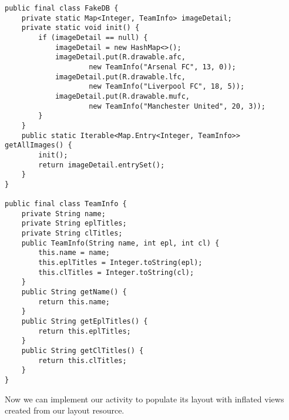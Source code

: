 \begin{lstlisting}[style=A_Java]
public final class FakeDB {
    private static Map<Integer, TeamInfo> imageDetail;
    private static void init() {
        if (imageDetail == null) {
            imageDetail = new HashMap<>();
            imageDetail.put(R.drawable.afc,
                    new TeamInfo("Arsenal FC", 13, 0));
            imageDetail.put(R.drawable.lfc,
                    new TeamInfo("Liverpool FC", 18, 5));
            imageDetail.put(R.drawable.mufc,
                    new TeamInfo("Manchester United", 20, 3));
        }
    }
    public static Iterable<Map.Entry<Integer, TeamInfo>> getAllImages() {
        init();
        return imageDetail.entrySet();
    }
}

public final class TeamInfo {
    private String name;
    private String eplTitles;
    private String clTitles;
    public TeamInfo(String name, int epl, int cl) {
        this.name = name;
        this.eplTitles = Integer.toString(epl);
        this.clTitles = Integer.toString(cl);
    }
    public String getName() {
        return this.name;
    }
    public String getEplTitles() {
        return this.eplTitles;
    }
    public String getClTitles() {
        return this.clTitles;
    }
}
\end{lstlisting}

Now we can implement our activity to populate its layout with inflated views created from our layout resource.


